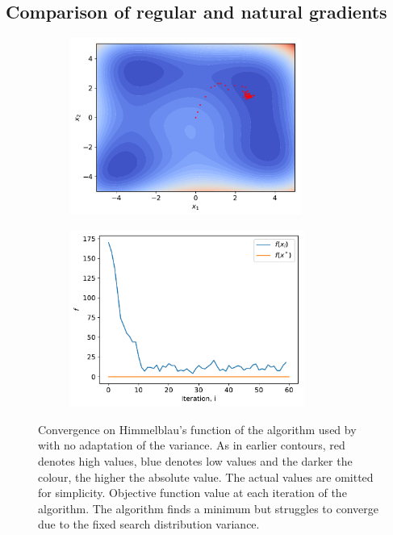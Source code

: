 \subsection{Comparison of regular and natural gradients}\label{sec: Natural Gradient: Comparison of regular and natural gradients}
\begin{figure}[tbp!]
    \begin{subfigure}[b]{0.49\textwidth}
        \centering
        \includegraphics[height=5.8cm]{graphics/var-opt-conv/ES-himmelblau-convergence.pdf}
        \caption{}
        \label{fig: Theory: var-opt-conv-ES-himmelblau-convergence}
    \end{subfigure}
    \hfill
    \begin{subfigure}[b]{0.49\textwidth}
        \centering
        \includegraphics[height=5.8cm]{graphics/var-opt-conv/ES-himmelblau-f.pdf}
        \caption{}
        \label{fig: Theory: var-opt-conv-ES-himmelblau-f}
    \end{subfigure}
    \caption{ Convergence on Himmelblau's function of the algorithm used by \cite{Salimans2017} with no adaptation of the variance. As in earlier contours, red denotes high values, blue denotes low values and the darker the colour, the higher the absolute value. The actual values are omitted for simplicity.  Objective function value at each iteration of the algorithm. The algorithm finds a minimum but struggles to converge due to the fixed search distribution variance.}
    \label{fig: Theory: var-opt-conv-ES-himmelblau}
\end{figure}
